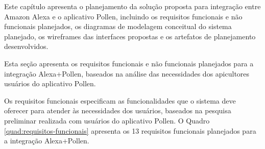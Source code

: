\label{cap:apresentacao-solucao}

Este capítulo apresenta o planejamento da solução proposta para integração entre Amazon Alexa e o aplicativo Pollen, incluindo os requisitos funcionais e não funcionais planejados, os diagramas de modelagem conceitual do sistema planejado, os wireframes das interfaces propostas e os artefatos de planejamento desenvolvidos.

\label{sec:requisitos-sistema}

Esta seção apresenta os requisitos funcionais e não funcionais planejados para a integração Alexa+Pollen, baseados na análise das necessidades dos apicultores usuários do aplicativo Pollen.


Os requisitos funcionais especificam as funcionalidades que o sistema deve oferecer para atender às necessidades dos usuários, baseados na pesquisa preliminar realizada com usuários do aplicativo Pollen. O Quadro \ref{quad:requisitos-funcionais} apresenta os 13 requisitos funcionais planejados para a integração Alexa+Pollen.

